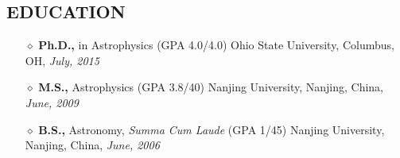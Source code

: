 \documentclass[10pt]{res}
\newcommand{\blockline}{\noindent\hspace{-0.03\textwidth}
{\rule{1.03\textwidth}{0.8pt}}}
\begin{document}
\begin{resume}
\section{\large EDUCATION}
\vspace{-0.2cm}
\noindent{\blockline}
\begin{itemize} [leftmargin=0.0cm]
 \item[$\diamond$]  {\bf Ph.D.,}  in Astrophysics (GPA 4.0/4.0) \hfill   Ohio State University, Columbus, OH, {\it July, 2015} 
 \item[$\diamond$]  {\bf M.S.,} Astrophysics (GPA 3.8/40) \hfill  Nanjing University, Nanjing, China, {\it June, 2009} 
 \item[$\diamond$]  {\bf B.S.,} Astronomy, {\it Summa Cum Laude} (GPA 1/45) \hfill Nanjing University, Nanjing, China,  {\it June, 2006}
\end{itemize} 


 



 




\end{resume}
\end{document}

